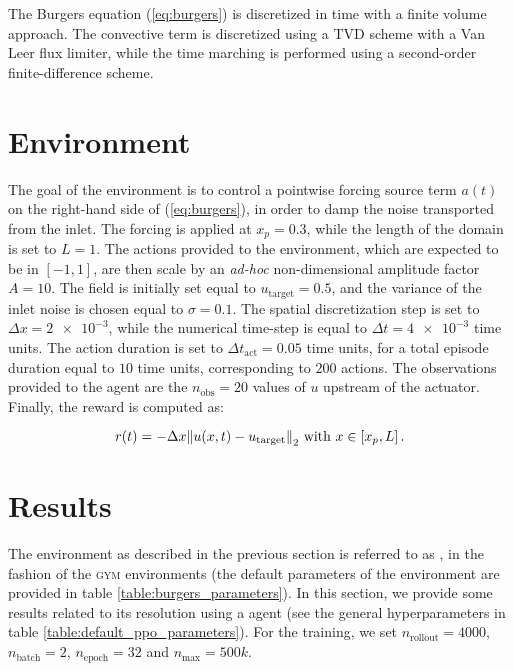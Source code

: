 The Burgers equation (\ref{eq:burgers}) is discretized in time with a finite volume approach. The convective term is discretized using a TVD scheme with a Van Leer flux limiter, while the time marching is performed using a second-order finite-difference scheme.

\section{Environment}

The goal of the environment is to control a pointwise forcing source term $a(t)$ on the right-hand side of (\ref{eq:burgers}), in order to damp the noise transported from the inlet. The forcing is applied at $x_p = 0.3$, while the length of the domain is set to $L=1$. The actions provided to the environment, which are expected to be in $\left[-1, 1\right]$, are then scale by an \textit{ad-hoc} non-dimensional amplitude factor $A=10$. The field is initially set equal to $u_\text{target} = 0.5$, and the variance of the inlet noise is chosen equal to $\sigma = 0.1$. The spatial discretization step is set to $\Delta x = \num{2e-3}$, while the numerical time-step is equal to $\Delta t = \num{4e-3}$ time units. The action duration is set to $\Delta t_\text{act} = 0.05$ time units, for a total episode duration equal to $10$ time units, corresponding to $200$ actions. The observations provided to the agent are the $n_\text{obs} = 20$ values of $u$ upstream of the actuator. Finally, the reward is computed as:

\begin{equation}
\label{eq:burgers_reward}
	r(t) = - \Delta x \norm{u(x,t) - u_\text{target}}_2 \text{ with } x \in \left[ x_p, L \right].
\end{equation}

\section{Results}

The environment as described in the previous section is referred to as , in the fashion of the \textsc{gym} environments (the default parameters of the environment are provided in table \ref{table:burgers_parameters}). In this section, we provide some results related to its resolution using a \ppo agent (see the general hyperparameters in table \ref{table:default_ppo_parameters}). For the training, we set $n_\text{rollout} = 4000$, $n_\text{batch} = 2$, $n_\text{epoch} = 32$ and $n_\text{max} = 500k$.

